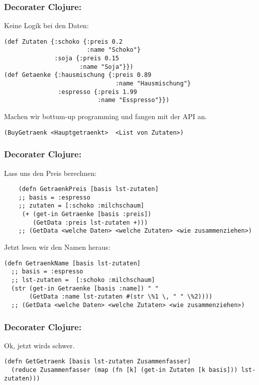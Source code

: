\documentclass[compress, blue]{beamer}
\begin{document}
\begin{frame}[fragile]\frametitle{Decorater Clojure:}
Keine Logik bei den Daten:
 \begin{lstlisting}
(def Zutaten {:schoko {:preis 0.2
                       :name "Schoko"}
              :soja {:preis 0.15 
                     :name "Soja"}})
(def Getaenke {:hausmischung {:preis 0.89 
                               :name "Hausmischung"}
               :espresso {:preis 1.99 
                          :name "Esspresso"}})
 \end{lstlisting}
\pause

Machen wir bottum-up programming und fangen mit der API an.

\begin{lstlisting}
(BuyGetraenk <Hauptgetraenkt>  <List von Zutaten>)
\end{lstlisting}
\pause
\end{frame}

\begin{frame}[fragile]\frametitle{Decorater Clojure:}

Lass uns den Preis berechnen:

  \begin{lstlisting}
    (defn GetraenkPreis [basis lst-zutaten]
    ;; basis = :espresso
    ;; zutaten = [:schoko :milchschaum]
     (+ (get-in Getraenke [basis :preis])
        (GetData :preis lst-zutaten +)))
    ;; (GetData <welche Daten> <welche Zutaten> <wie zusammenziehen>)
  \end{lstlisting}
\pause

Jetzt lesen wir den Namen heraus:

  \begin{lstlisting}
(defn GetraenkName [basis lst-zutaten]
  ;; basis = :espresso
  ;; lst-zutaten =  [:schoko :milchschaum]
  (str (get-in Getraenke [basis :name]) " "
       (GetData :name lst-zutaten #(str \%1 \, " " \%2))))
  ;; (GetData <welche Daten> <welche Zutaten> <wie zusammenziehen>)
  \end{lstlisting}
\pause

\end{frame}

\begin{frame}[fragiel]\frametitle{Decorater Clojure:}
  Ok, jetzt wirds schwer.

\begin{lstlisting}
(defn GetGetraenk [basis lst-zutaten Zusammenfasser]
  (reduce Zusammenfasser (map (fn [k] (get-in Zutaten [k basis])) lst-zutaten)))  
\end{lstlisting}
\pause
\end{frame}
\end{document}

